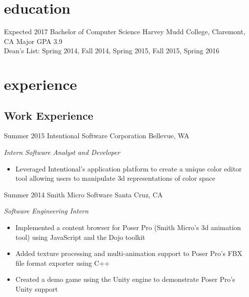 \documentclass[print]{friggeri-cv} %
\begin{document}

\section{education}

\begin{entrylist}


\entry
{Expected 2017}
{Bachelor {\normalfont of Computer Science}}
{Harvey Mudd College, Claremont, CA}
{Major GPA 3.9 \\ Dean's List: Spring 2014, Fall 2014, Spring 2015, Fall 2015, Spring 2016}



\end{entrylist}


\section{experience}

\subsection{Work Experience}

\begin{entrylist}


\entry
{Summer 2015}
{Intentional Software Corporation}
{Bellevue, WA}
{\emph{Intern Software Analyst and Developer}
\begin{itemize}
\item Leveraged Intentional's application platform to create a unique color editor tool allowing users to manipulate 3d representations of color space
\end{itemize}}
\entry
{Summer 2014}
{Smith Micro Software}
{Santa Cruz, CA}
{\emph{Software Engineering Intern}
\begin{itemize}
\item Implemented a content browser for Poser Pro (Smith Micro's 3d animation tool) using JavaScript
and the Dojo toolkit
\item Added texture processing and multi-animation support to Poser Pro's FBX file format exporter using C++
\item Created a demo game using the Unity engine to demonstrate Poser Pro's Unity support
\end{itemize}}


\end{entrylist}
\end{document}
